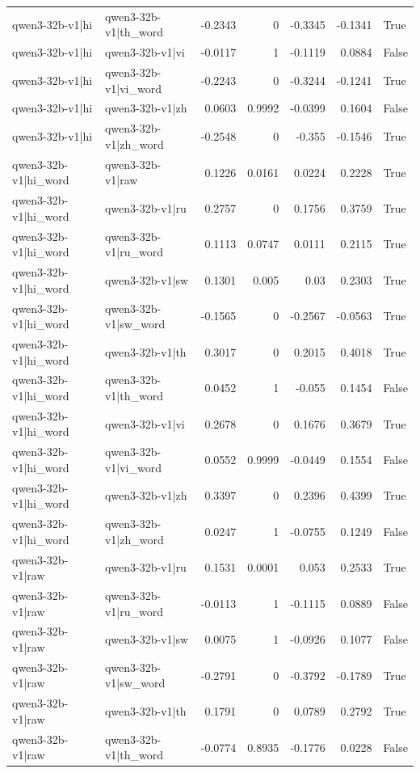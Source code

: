 \begin{table}
\begin{tabular}{l l r r r r l}
qwen3-32b-v1|hi & qwen3-32b-v1|th_word & -0.2343 & 0 & -0.3345 & -0.1341 & True \\
qwen3-32b-v1|hi & qwen3-32b-v1|vi & -0.0117 & 1 & -0.1119 & 0.0884 & False \\
qwen3-32b-v1|hi & qwen3-32b-v1|vi_word & -0.2243 & 0 & -0.3244 & -0.1241 & True \\
qwen3-32b-v1|hi & qwen3-32b-v1|zh & 0.0603 & 0.9992 & -0.0399 & 0.1604 & False \\
qwen3-32b-v1|hi & qwen3-32b-v1|zh_word & -0.2548 & 0 & -0.355 & -0.1546 & True \\
qwen3-32b-v1|hi_word & qwen3-32b-v1|raw & 0.1226 & 0.0161 & 0.0224 & 0.2228 & True \\
qwen3-32b-v1|hi_word & qwen3-32b-v1|ru & 0.2757 & 0 & 0.1756 & 0.3759 & True \\
qwen3-32b-v1|hi_word & qwen3-32b-v1|ru_word & 0.1113 & 0.0747 & 0.0111 & 0.2115 & True \\
qwen3-32b-v1|hi_word & qwen3-32b-v1|sw & 0.1301 & 0.005 & 0.03 & 0.2303 & True \\
qwen3-32b-v1|hi_word & qwen3-32b-v1|sw_word & -0.1565 & 0 & -0.2567 & -0.0563 & True \\
qwen3-32b-v1|hi_word & qwen3-32b-v1|th & 0.3017 & 0 & 0.2015 & 0.4018 & True \\
qwen3-32b-v1|hi_word & qwen3-32b-v1|th_word & 0.0452 & 1 & -0.055 & 0.1454 & False \\
qwen3-32b-v1|hi_word & qwen3-32b-v1|vi & 0.2678 & 0 & 0.1676 & 0.3679 & True \\
qwen3-32b-v1|hi_word & qwen3-32b-v1|vi_word & 0.0552 & 0.9999 & -0.0449 & 0.1554 & False \\
qwen3-32b-v1|hi_word & qwen3-32b-v1|zh & 0.3397 & 0 & 0.2396 & 0.4399 & True \\
qwen3-32b-v1|hi_word & qwen3-32b-v1|zh_word & 0.0247 & 1 & -0.0755 & 0.1249 & False \\
qwen3-32b-v1|raw & qwen3-32b-v1|ru & 0.1531 & 0.0001 & 0.053 & 0.2533 & True \\
qwen3-32b-v1|raw & qwen3-32b-v1|ru_word & -0.0113 & 1 & -0.1115 & 0.0889 & False \\
qwen3-32b-v1|raw & qwen3-32b-v1|sw & 0.0075 & 1 & -0.0926 & 0.1077 & False \\
qwen3-32b-v1|raw & qwen3-32b-v1|sw_word & -0.2791 & 0 & -0.3792 & -0.1789 & True \\
qwen3-32b-v1|raw & qwen3-32b-v1|th & 0.1791 & 0 & 0.0789 & 0.2792 & True \\
qwen3-32b-v1|raw & qwen3-32b-v1|th_word & -0.0774 & 0.8935 & -0.1776 & 0.0228 & False \\

\end{tabular}
\end{table}
